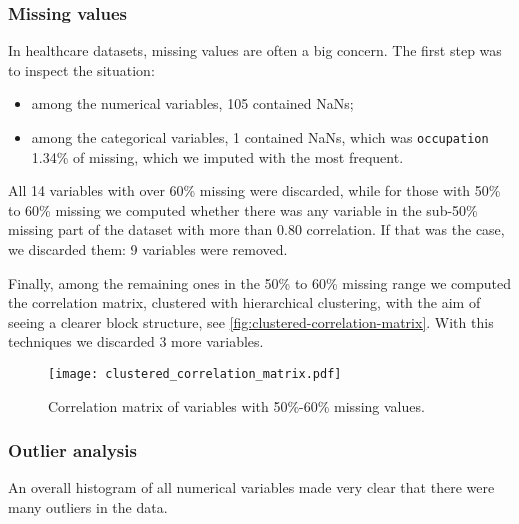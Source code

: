 \subsubsection{Missing values}

In healthcare datasets, missing values are often a big concern. The first step was to inspect the situation:
\begin{itemize}
    \item among the numerical variables, 105 contained NaNs;
    \item among the categorical variables, 1 contained NaNs, which was \texttt{occupation} 1.34\% of missing, which we imputed with the most frequent.
\end{itemize}



All 14 variables with over 60\% missing were discarded, while for those with 50\% to 60\% missing we computed whether there was any variable in the sub-50\% missing part of the dataset with more than 0.80 correlation. If that was the case, we discarded them: 9 variables were removed.

Finally, among the remaining ones in the 50\% to 60\% missing range we computed the correlation matrix, clustered with hierarchical clustering, with the aim of seeing a clearer block structure, see \autoref{fig:clustered-correlation-matrix}. With this techniques we discarded 3 more variables.

\begin{figure}[htpb]
    \centering
    \texttt{[image: clustered\_correlation\_matrix.pdf]}
    \caption{Correlation matrix of variables with 50\%-60\% missing values.}
    \label{fig:clustered-correlation-matrix}
\end{figure}

\subsubsection{Outlier analysis}\label{sec:outlier-analysis}

An overall histogram of all numerical variables made very clear that there were many outliers in the data.

